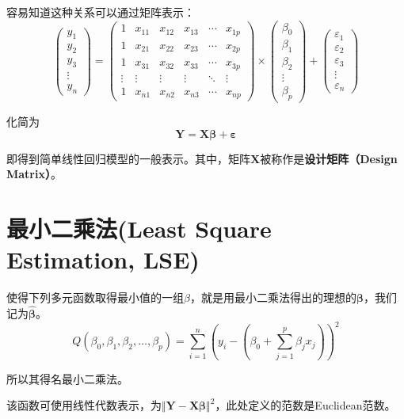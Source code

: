 \documentclass[UTF8]{ctexbook}
\begin{document}
容易知道这种关系可以通过矩阵表示：
\[
	\begin{pmatrix}
		y_1 \\
		y_2 \\
		y_3 \\
		\vdots \\
		y_n
	\end{pmatrix}
	=
	\begin{pmatrix}
		1 & x_{11} & x_{12} & x_{13} & \cdots & x_{1p} \\
		1 & x_{21} & x_{22} & x_{23} & \cdots & x_{2p} \\
		1 & x_{31} & x_{32} & x_{33} & \cdots & x_{3p} \\
		\vdots & \vdots & \vdots & \vdots & \ddots & \vdots \\
		1 & x_{n1} & x_{n2} & x_{n3} & \cdots & x_{np}
	\end{pmatrix}
	\times
	\begin{pmatrix}
		\beta_0 \\
		\beta_1 \\
		\beta_2 \\
		\vdots \\
		\beta_p
	\end{pmatrix}
	+
	\begin{pmatrix}
		\varepsilon_1 \\
		\varepsilon_2 \\
		\varepsilon_3 \\
		\vdots \\
		\varepsilon_n
	\end{pmatrix}
\]

化简为
\[
	\boldsymbol{Y}=\boldsymbol{X\beta}+\boldsymbol{\varepsilon}
\]

即得到简单线性回归模型的一般表示。其中，矩阵$\boldsymbol{X}$被称作是\textbf{设计矩阵（Design Matrix）}。


\section{最小二乘法(Least Square Estimation, LSE)}
\label{LSE definition}
使得下列多元函数取得最小值的一组$\beta$，就是用最小二乘法得出的理想的$\boldsymbol{\beta}$，我们记为$\boldsymbol{\hat\beta}$。
\[
Q(\beta_0,\beta_1,\beta_2,\dots,\beta_p)=\sum_{i=1}^n(y_i-(\beta_0+\sum_{j=1}^p\beta_jx_j))^2
\]

所以其得名最小二乘法。

该函数可使用线性代数表示，为$\Vert\boldsymbol{Y}-\boldsymbol{X\beta}\Vert^2$，此处定义的范数是Euclidean范数。
\end{document}
